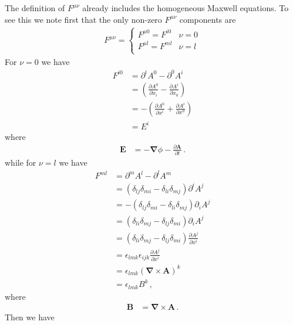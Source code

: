 The definition of $F^{\mu\nu}$ already includes the homogeneous Maxwell equations. To see this we note first that the only non-zero $F^{\mu\nu}$ components are
\begin{align}
  F^{\mu\nu}=  \begin{cases}
    F^{\mu0}=F^{i0} & \text{$\nu=0$}\\
    F^{\mu l}=F^{ml} & \text{$\nu=l$}\\
  \end{cases}
\end{align}
For $\nu=0$ we have
\begin{align}
F^{i0}  &=\partial^{i}A^0-\partial^0 A^{i}\nonumber\\
  &=(\frac{\partial A^0}{\partial x_i}-\frac{\partial A^{i}}{\partial x_0})\nonumber\\
&=-(\frac{\partial A^0}{\partial x^{i}}+\frac{\partial A^{i}}{\partial x^0})\nonumber\\
&=E^i
\end{align}
where
\begin{align}
\label{eq:173qft}
   \mathbf{E}&=-\boldsymbol{\nabla}\phi-\frac{\partial\mathbf{A}}{\partial t}\,.
\end{align}
while for $\nu=l$ we have
\begin{align}
F^{ml}  &=\partial^m A^l-\partial^l A^m\nonumber\\
  &=(\delta_{lj}\delta_{mi}-\delta_{li}\delta_{mj}){\partial^iA^j}\nonumber\\
  &=-(\delta_{lj}\delta_{mi}-\delta_{li}\delta_{mj}){\partial_iA^j}\nonumber\\
  &=(\delta_{li}\delta_{mj}-\delta_{lj}\delta_{mi}){\partial_iA^j}\nonumber\\
  &=(\delta_{li}\delta_{mj}-\delta_{lj}\delta_{mi})\frac{\partial A^j}{\partial x^{i}}\nonumber\\
    &=\epsilon_{lmk}\epsilon_{ijk}\frac{\partial A^j}{\partial x^{i}}\nonumber\\
&=\epsilon_{lmk}\left(\boldsymbol{\nabla}\times  \mathbf{A}\right)^k\nonumber\\
&=\epsilon_{lmk}B^k\,,
\end{align}
where
\begin{align}
\label{eq:174qft}
  \mathbf{B}&=\boldsymbol{\nabla}\times \mathbf{A}\,.
\end{align}
Then we have
